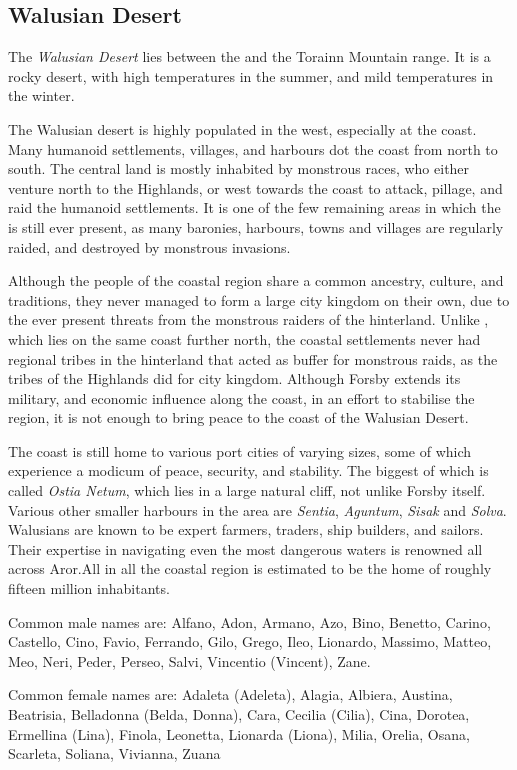 \subsection{Walusian Desert}
\label{sec:Walusian Desert}

The \emph{Walusian Desert} lies between the 
and the Torainn Mountain range. It is a rocky desert, with high temperatures
in the summer, and mild temperatures in the winter.

The Walusian desert is highly populated in the west, especially at the coast.
Many humanoid settlements, villages, and harbours dot the coast from north
to south. The central land is mostly inhabited by monstrous races, who either
venture north to the Highlands, or west towards the coast to attack, pillage,
and raid the humanoid settlements. It is one of the few remaining areas in
which the  is still ever present, as many baronies,
harbours, towns and villages are regularly raided, and destroyed by monstrous
invasions.

Although the people of the coastal region share a common ancestry, culture,
and traditions, they never managed to form a large city kingdom on their own,
due to the ever present threats from the monstrous raiders of the hinterland.
Unlike , which lies on the same coast further north, the
coastal settlements never had regional tribes in the hinterland that acted as
buffer for monstrous raids, as the tribes of the Highlands did for city
kingdom. Although Forsby extends its military, and economic influence along
the coast, in an effort to stabilise the region, it is not enough to bring
peace to the coast of the Walusian Desert.

The coast is still home to various port cities of varying sizes, some of which
experience a modicum of peace, security, and stability. The biggest of which
is called \emph{Ostia Netum}, which lies in a large natural cliff, not unlike
Forsby itself. Various other smaller harbours in the area are \emph{Sentia},
\emph{Aguntum}, \emph{Sisak} and \emph{Solva}. Walusians are known to be
expert farmers, traders, ship builders, and sailors. Their expertise in
navigating even the most dangerous waters is renowned all across Aror.All in
all the coastal region is estimated to be the home of roughly fifteen million
inhabitants.

Common male names are: Alfano, Adon, Armano, Azo, Bino, Benetto, Carino,
Castello, Cino, Favio, Ferrando, Gilo, Grego, Ileo, Lionardo, Massimo, Matteo,
Meo, Neri, Peder, Perseo, Salvi, Vincentio (Vincent), Zane.

Common female names are: Adaleta (Adeleta), Alagia, Albiera, Austina,
Beatrisia, Belladonna (Belda, Donna), Cara, Cecilia (Cilia), Cina, Dorotea,
Ermellina (Lina), Finola, Leonetta, Lionarda (Liona), Milia, Orelia, Osana,
Scarleta, Soliana, Vivianna, Zuana
